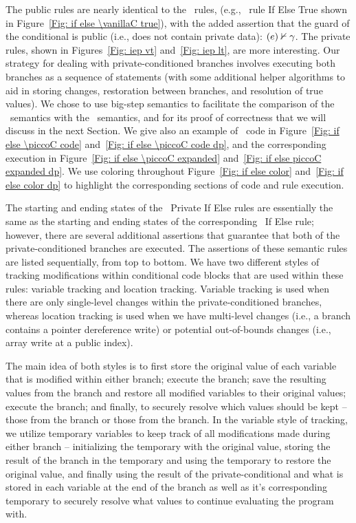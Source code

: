
The public  rules 
are nearly identical to the \vanillaC\ rules, (e.g., \vanillaC\ rule If Else True shown in Figure~\ref{Fig: if else \vanillaC true}), 
with the added assertion that the guard of the conditional is public (i.e., does not contain private data): $(e) \nvdash \gamma$.
%
The private  rules, shown in Figures~\ref{Fig: iep vt} and~\ref{Fig: iep lt}, are more interesting. Our strategy for dealing with private-conditioned branches involves executing both branches as a sequence of statements (with some additional helper algorithms to aid in storing changes, restoration between branches, and resolution of true values). 
We chose to use big-step semantics to facilitate the comparison of the \piccoC\ semantics with the \vanillaC\ semantics, and for its proof of correctness that we will discuss in the next Section. 
We give also an example of \piccoC\ code in Figure~\ref{Fig: if else \piccoC code} and~\ref{Fig: if else \piccoC code dp}, and the corresponding execution in Figure~\ref{Fig: if else \piccoC expanded} and~\ref{Fig: if else piccoC expanded dp}. We use coloring throughout Figure~\ref{Fig: if else color} and~\ref{Fig: if else color dp} to highlight the corresponding sections of code and rule execution. 

The starting and ending states of the \piccoC\ Private If Else rules are essentially the same as the starting and ending states of the corresponding \vanillaC\ If Else rule; however, there are several additional assertions that guarantee that both of the private-conditioned branches are executed. 
The assertions of these semantic rules are listed sequentially, from top to bottom.
We have two different styles of tracking modifications within conditional code blocks that are used within these rules: variable tracking and location tracking. 
Variable tracking is used when there are only single-level changes within the private-conditioned branches, whereas location tracking is used when we have multi-level changes (i.e., a branch contains a pointer dereference write) or potential out-of-bounds changes (i.e., array write at a public index). 

The main idea of both styles is to first store the original value of each variable that is modified within either branch; execute the  branch; save the resulting values from the  branch and restore all modified variables to their original values; execute the  branch; and finally, to securely resolve which values should be kept -- those from the  branch or those from the  branch. 
In the variable style of tracking, we utilize temporary variables to keep track of all modifications made during either branch -- initializing the  temporary with the original value, storing the result of the  branch in the  temporary and using the  temporary to restore the original value, and finally using the result of the private-conditional and what is stored in each variable at the end of the  branch as well as it's corresponding  temporary to securely resolve what values to continue evaluating the program with. 

